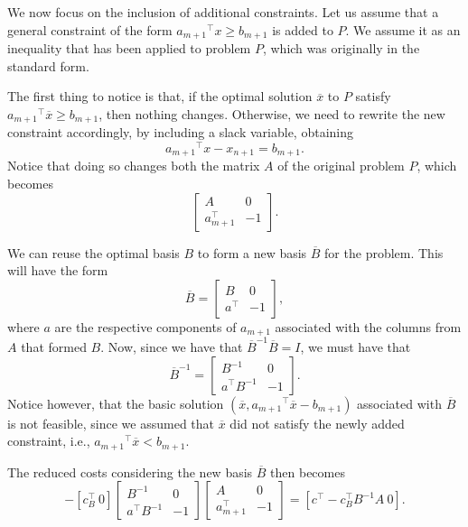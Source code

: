 We now focus on the inclusion of additional constraints. Let us assume that a general constraint of the form ${a_{m+1}}^\top x \geq b_{m+1}$ is added to $P$. We assume it as an inequality that has been applied to problem $P$, which was originally in the standard form.

The first thing to notice is that, if the optimal solution $\overline{x}$ to $P$ satisfy ${a_{m+1}}^\top \overline{x} \geq b_{m+1}$, then nothing changes. Otherwise, we need to rewrite the new constraint accordingly, by including a slack variable, obtaining 
%
\begin{equation*}
	{a_{m+1}}^\top x - x_{n+1} = b_{m+1}.
\end{equation*}
%
Notice that doing so changes both the matrix $A$ of the original problem $P$, which becomes
%
\begin{equation*}
	\begin{bmatrix}
		A & 0 \\ a^\top_{m+1} & -1 
	\end{bmatrix}.
\end{equation*}

We can reuse the optimal basis $B$ to form a new basis $\overline{B}$ for the problem. This will have the form
%
\begin{equation*}
	\overline{B} = \begin{bmatrix}
		B & 0 \\ a^\top & -1 
	\end{bmatrix},	
\end{equation*}
%
where $a$ are the respective components of $a_{m+1}$ associated with the columns from $A$ that formed $B$. Now, since we have that $\overline{B}^{-1}\overline{B} = I$, we must have that 
%
\begin{equation*}
	\overline{B}^{-1} = \begin{bmatrix}
		B^{-1} & 0 \\ a^\top B^{-1} & -1 
	\end{bmatrix}.	
\end{equation*}
%
Notice however, that the basic solution $(\overline{x}, {a_{m+1}}^\top \overline{x} -  b_{m+1})$ associated with $\overline{B}$ is not feasible, since we assumed that $\overline{x}$ did not satisfy the newly added constraint, i.e., ${a_{m+1}}^\top \overline{x} < b_{m+1}$.

The reduced costs considering the new basis $\overline{B}$ then becomes
%
\begin{equation*}
	[c^\top ~ 0] - [c_B^\top ~ 0]\begin{bmatrix} B^{-1} & 0 \\ a^\top B^{-1} & -1 \end{bmatrix}\begin{bmatrix} A & 0 \\ a_{m+1}^\top & -1 \end{bmatrix} = [c^\top - c^\top_B B^{-1}A ~ 0].
\end{equation*}
  	
